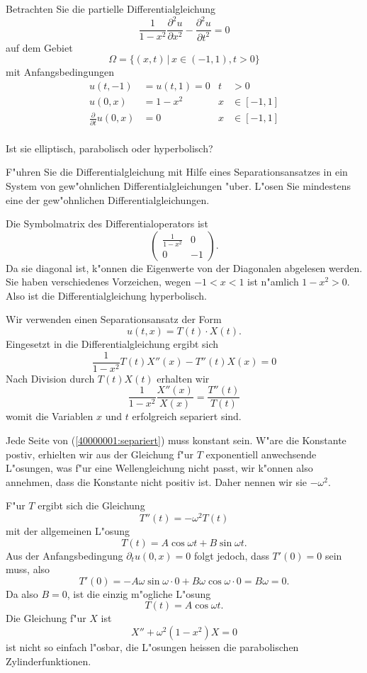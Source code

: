 Betrachten Sie die partielle Differentialgleichung
\[
\frac1{1-x^2}\frac{\partial^2 u}{\partial x^2}
-
\frac{\partial^2 u}{\partial t^2}=0
\]
auf dem Gebiet
\[
\Omega=\{(x,t)\,|\, x\in (-1,1), t>0\}
\]
mit Anfangsbedingungen
\begin{align*}
u(t,-1)&=u(t,1)=0&t&>0\\
u(0,x)&=1-x^2&x&\in[-1,1]\\
\frac{\partial}{\partial t}u(0,x)&=0&x&\in[-1,1]\\
\end{align*}
\begin{teilaufgaben}
\item Ist sie elliptisch, parabolisch oder hyperbolisch?
\item F"uhren Sie die Differentialgleichung mit Hilfe eines
Separationsansatzes in ein System von gew"ohnlichen
Differentialgleichungen "uber. L"osen Sie mindestens eine der
gew"ohnlichen Differentialgleichungen.
\end{teilaufgaben}

\begin{loesung}
\begin{teilaufgaben}
\item
Die Symbolmatrix des Differentialoperators ist
\[
\begin{pmatrix}
\frac1{1-x^2}&0\\0&-1
\end{pmatrix}.
\]
Da sie diagonal ist, k"onnen die Eigenwerte von der Diagonalen
abgelesen werden. Sie haben verschiedenes Vorzeichen, wegen
$-1<x<1$ ist n"amlich $1-x^2>0$. Also ist die Differentialgleichung
hyperbolisch.
\item
Wir verwenden einen Separationsansatz der Form
\[
u(t,x)=T(t)\cdot X(t).
\]
Eingesetzt in die Differentialgleichung ergibt sich
\[
\frac1{1-x^2}T(t)X''(x)-T''(t)X(x)=0
\]
Nach Division durch $T(t)X(t)$ erhalten wir
\begin{equation}
\frac1{1-x^2}\frac{X''(x)}{X(x)}=\frac{T''(t)}{T(t)}
\label{40000001:separiert}
\end{equation}
womit die Variablen $x$ und $t$ erfolgreich separiert sind.

Jede Seite von (\ref{40000001:separiert}) muss konstant sein. W"are die
Konstante postiv, erhielten wir aus der Gleichung f"ur $T$ exponentiell
anwechsende L"osungen, was f"ur eine Wellengleichung nicht passt, wir
k"onnen also annehmen, dass die Konstante nicht positiv ist.
Daher nennen wir sie $-\omega^2$.

F"ur $T$ ergibt sich die Gleichung
\[
T''(t)=-\omega^2 T(t)
\]
mit der allgemeinen L"osung
\[
T(t)=A\cos\omega t+B\sin\omega t.
\]
Aus der Anfangsbedingung $\partial_t u(0,x)=0$ folgt jedoch, dass
$T'(0)=0$ sein muss, also
\[
T'(0)=-A\omega\sin\omega \cdot 0+B\omega\cos\omega\cdot 0=B\omega=0.
\]
Da also $B=0$, ist die einzig m"ogliche L"osung
\[
T(t)=A\cos\omega t.
\]
Die Gleichung f"ur $X$ ist
\[
X''+\omega^2(1-x^2)X=0
\]
ist nicht so einfach l"osbar, die L"osungen heissen die parabolischen
Zylinderfunktionen.
\end{teilaufgaben}
\end{loesung}

